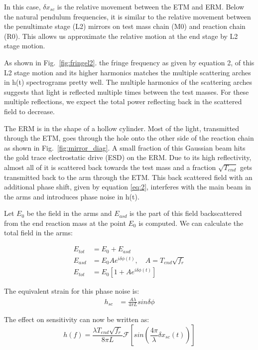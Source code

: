 \documentclass[12pt]{iopart}
\begin{document}
In this case, ${\delta x_{sc}}$ is the relative movement between the ETM and ERM. Below the natural pendulum frequencies, it is similar to the relative movement between the penultimate stage (L2) mirrors on test mass chain (M0) and reaction chain (R0).  This allows us approximate the relative motion at the end stage by L2 stage motion.


As shown in Fig.~\ref{fig:fringel2}. the fringe frequency as given by equation 2, of this L2 stage motion and its higher harmonics matches the multiple scattering arches in h(t) spectrograms pretty well. The multiple harmonics of the scattering arches suggests that light is reflected multiple times between the test masses.  For these multiple reflections, we expect the total power reflecting back in the scattered field to decrease. 
\par
The ERM is in the shape of a hollow cylinder. Most of the light, transmitted through the ETM, goes through the hole onto the other side of the reaction chain as shown in Fig.~\ref{fig:mirror_diag}. A small fraction of this Gaussian beam hits the gold trace electrostatic drive (ESD) on the ERM. Due to its high reflectivity, almost all of it is scattered back towards the test mass and a fraction $\sqrt{T_{end}}$ gets transmitted back to the arm through the ETM. This back scattered field with an additional phase shift, given by equation \ref{eq:2}, interferes with the main beam in the arms and introduces phase noise in h(t).
\par
Let $E_{0}$ be the field in the arms and $E_{asd}$ is the part of this field backscattered from the end reaction mass at the point $E_{0}$ is computed. We can calculate the total field in the arms:

\begin{align}
    E_{tot} &= E_{0} + E_{asd} \label{eq:4} \\
    E_{asd} &= E_{0}Ae^{i{\delta}{\phi}(t)} ,\quad A = T_{end}\sqrt{f_{r}}  \label{eq:5} \\ 
    E_{tot} &= E_{0}[1 + Ae^{i{\delta}{\phi}(t)}]  \label{eq:6}
\end{align}


The equivalent strain for this phase noise is:
\begin{align}
    h_{sc} &= \frac{A{\lambda}}{4{\pi}L}sin{\delta}{\phi}  \label{eq:7}
\end{align}

The effect on sensitivity can now be written as:
\begin{equation}
    h(f) = \frac{\lambda T_{end}\sqrt{f_{r}}}{8{\pi}L}\mathcal{F}[sin(\frac{4{\pi}}{\lambda}{\delta x_{sc}(t)})]  \label{eq:8}
\end{equation}
\end{document}
